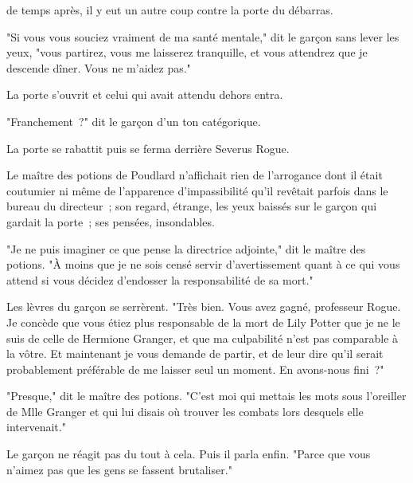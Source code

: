 
 de temps après, il y eut un autre coup contre la porte du débarras.

\hplettrineextrapara
"Si vous vous souciez vraiment de ma santé mentale," dit le garçon sans lever les yeux, "vous partirez, vous me laisserez tranquille, et vous attendrez que je descende dîner. Vous ne m'aidez pas."

La porte s'ouvrit et celui qui avait attendu dehors entra.

"Franchement~?" dit le garçon d'un ton catégorique.

La porte se rabattit puis se ferma derrière Severus Rogue.

Le maître des potions de Poudlard n'affichait rien de l'arrogance dont il était coutumier ni même de l'apparence d'impassibilité qu'il revêtait parfois dans le bureau du directeur~; son regard, étrange, les yeux baissés sur le garçon qui gardait la porte~; ses pensées, insondables.

"Je ne puis imaginer ce que pense la directrice adjointe," dit le maître des potions. "À moins que je ne sois censé servir d'avertissement quant à ce qui vous attend si vous décidez d'endosser la responsabilité de sa mort."

Les lèvres du garçon se serrèrent. "Très bien. Vous avez gagné, professeur Rogue. Je concède que vous étiez plus responsable de la mort de Lily Potter que je ne le suis de celle de Hermione Granger, et que ma culpabilité n'est pas comparable à la vôtre. Et maintenant je vous demande de partir, et de leur dire qu'il serait probablement préférable de me laisser seul un moment. En avons-nous fini~?"

"Presque," dit le maître des potions. "C'est moi qui mettais les mots sous l'oreiller de Mlle Granger et qui lui disais où trouver les combats lors desquels elle intervenait."

Le garçon ne réagit pas du tout à cela. Puis il parla enfin. "Parce que vous n'aimez pas que les gens se fassent brutaliser."

